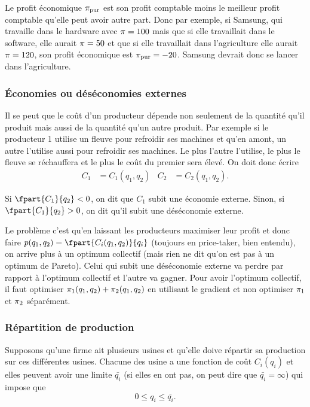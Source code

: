 Le profit économique $\pi_{\mathrm{pur}}$ est son profit comptable moins le meilleur
profit comptable qu'elle peut avoir autre part.
Donc par exemple, si Samsung, qui travaille dans le hardware avec
$\pi = 100$ mais que si elle travaillait dans le software, elle aurait
$\pi = 50$ et que si elle travaillait dans l'agriculture elle aurait
$\pi = 120$, son profit économique est $\pi_{\mathrm{pur}} = -20$.
Samsung devrait donc se lancer dans l'agriculture.

\subsubsection{Économies ou déséconomies externes}
Il se peut que le coût d'un producteur dépende non seulement de la quantité
qu'il produit mais aussi de la quantité qu'un autre produit.
Par exemple si le producteur 1 utilise un fleuve pour refroidir ses
machines et qu'en amont, un autre l'utilise aussi pour refroidir ses machines.
Le plus l'autre l'utilise, le plus le fleuve se réchauffera et le plus le
coût du premier sera élevé.
On doit donc écrire
\begin{align*}
  C_1 & = C_1(q_1, q_2) & C_2 & = C_2(q_1,q_2).
\end{align*}

Si $\fpart{C_1}{q_2} < 0$, on dit que $C_1$ subit une économie externe.
Sinon, si $\fpart{C_1}{q_2} > 0$, on dit qu'il subit une déséconomie
externe.

Le problème c'est qu'en laissant les producteurs maximiser leur profit
et donc faire $p(q_1, q_2) = \fpart{C_i(q_1, q_2)}{q_i}$
(toujours en price-taker, bien entendu),
on arrive plus à un optimum collectif
(mais rien ne dit qu'on est pas à un optimum de Pareto).
Celui qui subit une déséconomie externe va perdre par rapport à l'optimum
collectif et l'autre va gagner.
Pour avoir l'optimum collectif,
il faut optimiser $\pi_1(q_1, q_2) + \pi_2(q_1, q_2)$
en utilisant le gradient et
non optimiser $\pi_1$ et $\pi_2$ séparément.

\subsubsection{Répartition de production}
Supposons qu'une firme ait plusieurs usines et
qu'elle doive répartir sa production sur ces différentes usines.
Chacune des usine a une fonction de coût $C_i(q_i)$ et elles peuvent
avoir une limite $\bar{q_i}$
(si elles en ont pas, on peut dire que $\bar{q_i} = \infty$)
qui impose que
\[ 0 \leq q_i \leq \bar{q_i}. \]

